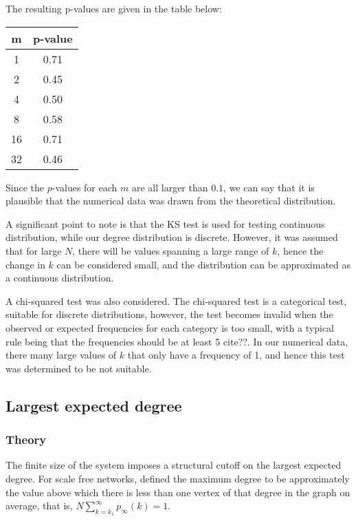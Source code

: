 The resulting p-values are given in the table below:
\begin{center}
\begin{tabular}{ c | c }
 m &  p-value\\ 
 \hline
 1 & 0.71 \\  
 2 & 0.45 \\
 4 & 0.50 \\
 8 & 0.58 \\
 16 & 0.71 \\
 32 & 0.46 \\  
\end{tabular}
\label{table:ks-test-all}
\end{center}

Since the $p$-values for each $m$ are all larger than $0.1$, we can say that it is plausible that the numerical data was drawn from the theoretical distribution. 

A significant point to note is that the KS test is used for testing continuous distribution, while our degree distribution is discrete. However, it was assumed that for large $N$, there will be values spanning a large range of $k$, hence the change in $k$ can be considered small, and the distribution can be approximated as a continuous distribution. 

A chi-squared test was also considered. The chi-squared test is a categorical test, suitable for discrete distributions, however, the test becomes invalid when the observed or expected frequencies for each category is too small, with a typical rule being that the frequencies should be at least 5 cite??. In our numerical data, there many large values of $k$ that only have a frequency of 1, and hence this test was determined to be not suitable. 

\subsection{Largest expected degree}
\subsubsection{Theory}
The finite size of the system imposes a structural cutoff on the largest expected degree. For scale free networks, \citet{Aiello2001a} defined the maximum degree to be approximately the value above which there is less than one vertex of that degree in the graph on average, that is, $N \sum_{k = k_1}^\infty p_\infty(k) = 1$. 

